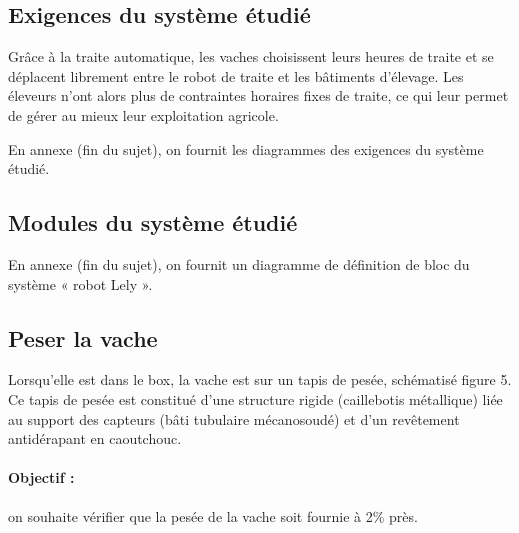 \subsection{Exigences du système étudié}

Grâce à la traite automatique, les vaches choisissent leurs heures de traite et se déplacent librement entre le robot de traite et les bâtiments d’élevage. Les éleveurs n’ont alors plus de contraintes horaires fixes de traite, ce qui leur permet de gérer au mieux leur exploitation agricole.

En annexe (fin du sujet), on fournit les diagrammes des exigences du système étudié.



\subsection{Modules du système étudié}

En annexe (fin du sujet), on fournit un diagramme de définition de bloc du système « robot  Lely ».




\subsection{Peser la vache}

Lorsqu’elle est dans le box, la vache est sur un tapis de pesée, schématisé figure 5. Ce tapis de pesée est constitué d’une structure rigide (caillebotis métallique) liée au support des capteurs (bâti tubulaire mécanosoudé) et d’un revêtement antidérapant en caoutchouc.

\paragraph{Objectif :} on souhaite vérifier que la pesée de la vache soit fournie à 2\% près.


